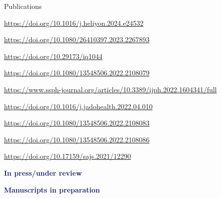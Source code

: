 \begin{rSection}{Publications}

\begin{etaremune}
\item {} \url{https://doi.org/10.1016/j.heliyon.2024.e24532}
\item {} \url{https://doi.org/10.1080/26410397.2023.2267893}
\item {} \url{https://doi.org/10.29173/iq1044}
\item {} \url{https://doi.org/10.1080/13548506.2022.2108079}
\item {} \url{https://www.ssph-journal.org/articles/10.3389/ijph.2022.1604341/full}
\item {} \url{https://doi.org/10.1016/j.jadohealth.2022.04.010}
\item {} \url{https://doi.org/10.1080/13548506.2022.2108083}
\item {} \url{https://doi.org/10.1080/13548506.2022.2108086}
\item {} \url{https://doi.org/10.17159/sajs.2021/12290}
\end{etaremune}

\vspace{1em}
\textcolor{MidnightBlue}{\textbf{In press/under review}}
\vspace{1em}

\begin{etaremune}
\item {}
\item {}
\item {}
\item {}
\end{etaremune}

\vspace{1em}
\textcolor{MidnightBlue}{\textbf{Manuscripts in preparation}}
\vspace{1em}

\begin{etaremune}
\item {}
\item {}
\item {}
\end{etaremune}


\end{rSection}
